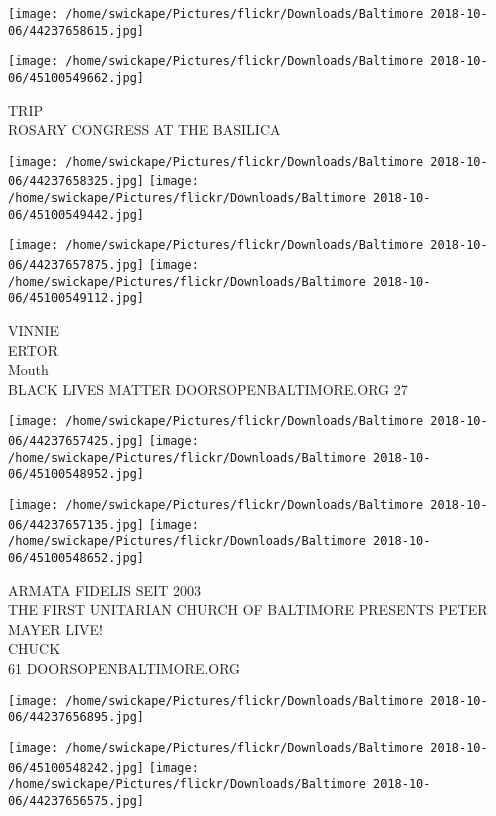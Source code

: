 \documentclass[10pt,letterpaper]{article}
\begin{document}
\texttt{[image: /home/swickape/Pictures/flickr/Downloads/Baltimore 2018-10-06/44237658615.jpg]}

\vspace{0.25in}
\texttt{[image: /home/swickape/Pictures/flickr/Downloads/Baltimore 2018-10-06/45100549662.jpg]}

TRIP\\
ROSARY CONGRESS AT THE BASILICA\\
\pagebreak

\texttt{[image: /home/swickape/Pictures/flickr/Downloads/Baltimore 2018-10-06/44237658325.jpg]}
\texttt{[image: /home/swickape/Pictures/flickr/Downloads/Baltimore 2018-10-06/45100549442.jpg]}

\texttt{[image: /home/swickape/Pictures/flickr/Downloads/Baltimore 2018-10-06/44237657875.jpg]}
\texttt{[image: /home/swickape/Pictures/flickr/Downloads/Baltimore 2018-10-06/45100549112.jpg]}

VINNIE\\
ERTOR\\
Mouth\\
BLACK LIVES MATTER DOORSOPENBALTIMORE.ORG 27\\
\pagebreak

\texttt{[image: /home/swickape/Pictures/flickr/Downloads/Baltimore 2018-10-06/44237657425.jpg]}
\texttt{[image: /home/swickape/Pictures/flickr/Downloads/Baltimore 2018-10-06/45100548952.jpg]}

\texttt{[image: /home/swickape/Pictures/flickr/Downloads/Baltimore 2018-10-06/44237657135.jpg]}
\texttt{[image: /home/swickape/Pictures/flickr/Downloads/Baltimore 2018-10-06/45100548652.jpg]}

ARMATA FIDELIS SEIT 2003\\
THE FIRST UNITARIAN CHURCH OF BALTIMORE PRESENTS PETER MAYER LIVE!\\
CHUCK\\
61 DOORSOPENBALTIMORE.ORG\\
\pagebreak

\texttt{[image: /home/swickape/Pictures/flickr/Downloads/Baltimore 2018-10-06/44237656895.jpg]}

\vspace{0.25in}
\texttt{[image: /home/swickape/Pictures/flickr/Downloads/Baltimore 2018-10-06/45100548242.jpg]}
\texttt{[image: /home/swickape/Pictures/flickr/Downloads/Baltimore 2018-10-06/44237656575.jpg]}
\end{document}

